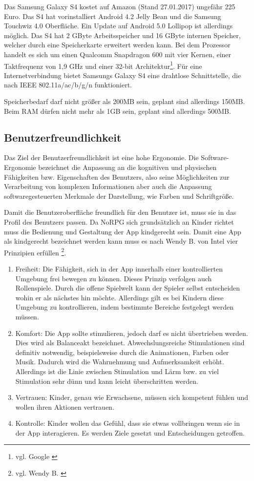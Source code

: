 		Das Samsung Galaxy S4 kostet auf Amazon (Stand 27.01.2017) ungefähr 225 Euro. Das S4 hat vorinstalliert Android 4.2 Jelly Bean und die Samsung Touchwiz 4.0 Oberfläche. Ein Update auf Android 5.0 Lollipop ist allerdings möglich. Das S4 hat 2 GByte Arbeitsspeicher und 16 GByte internen Speicher, welcher durch eine Speicherkarte erweitert werden kann. Bei dem Prozessor handelt es sich um einen Qualcomm Snapdragon 600 mit vier Kernen, einer Taktfrequenz von 1,9 GHz und einer 32-bit Architektur\footnote{vgl. Google \cite{s4Google}}. Für eine Internetverbindung bietet Samsungs Galaxy S4 eine drahtlose Schnittstelle, die nach IEEE 802.11a/ac/b/g/n funktioniert.
		
		Speicherbedarf darf nicht größer als 200MB sein, geplant sind allerdings 150MB. Beim RAM dürfen nicht mehr als 1GB sein, geplant sind allerdings 500MB.
	
	\subsection{Benutzerfreundlichkeit}
		Das Ziel der Benutzerfreundlichkeit ist eine hohe Ergonomie. Die Software-Ergonomie bezeichnet die Anpassung an die kognitiven und physischen Fähigkeiten bzw. Eigenschaften des Benutzers, also seine Möglichkeiten zur Verarbeitung von komplexen Informationen aber auch die Anpassung softwaregesteuerten Merkmale der Darstellung, wie Farben und Schriftgröße.
		
		Damit die Benutzeroberfläche freundlich für den Benutzer ist, muss sie in das Profil des Benutzers passen. Da NoRPG sich grundsätzlich an Kinder richtet muss die Bedienung und Gestaltung der App kindgerecht sein. Damit eine App als kindgerecht bezeichnet werden kann muss es nach Wendy B. von Intel vier Prinzipien erfüllen \footnote{vgl. Wendy B. \cite{intelKids}}.
		
		\begin{enumerate}
			\item{Freiheit: Die Fähigkeit, sich in der App innerhalb einer kontrollierten Umgebung frei bewegen zu können. Dieses Prinzip verfolgen auch Rollenspiele. Durch die offene Spielwelt kann der Spieler selbst entscheiden wohin er als nächstes hin möchte. Allerdings gilt es bei Kindern diese Umgebung zu kontrollieren, indem bestimmte Bereiche festgelegt werden müssen.}
			\item{Komfort: Die App sollte stimulieren, jedoch darf es nicht übertrieben werden. Dies wird als Balanceakt bezeichnet. Abwechslungsreiche Stimulationen sind definitiv notwendig, beispielsweise durch die Animationen, Farben oder Musik. Dadurch wird die Wahrnehmung und Aufmerksamkeit erhöht. Allerdings ist die Linie zwischen Stimulation und Lärm bzw. zu viel Stimulation sehr dünn und kann leicht überschritten werden.}
			\item{Vertrauen: Kinder, genau wie Erwachsene, müssen sich kompetent fühlen und wollen ihren Aktionen vertrauen.}
			\item{Kontrolle: Kinder wollen das Gefühl, dass sie etwas vollbringen wenn sie in der App interagieren. Es werden Ziele gesetzt und Entscheidungen getroffen.}
		\end{enumerate}
	
